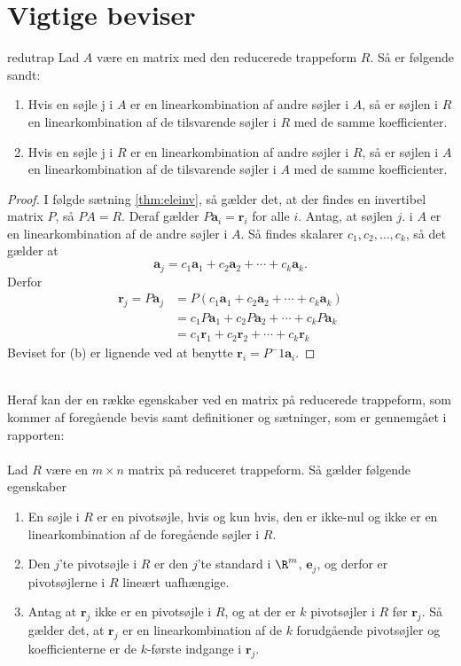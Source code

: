 \chapter{Vigtige beviser}

\begin{thm}{}{redutrap}
Lad $A$ være en matrix med den reducerede trappeform $R$. Så er følgende sandt:
\begin{enumerate}[label=(\alph*)]
\item  Hvis en søjle j i $A$ er en linearkombination  af andre søjler i $A$, så er søjlen i $R$ en linearkombination af de tilsvarende søjler i $R$ med de samme koefficienter.
\item  Hvis en søjle j i $R$ er en linearkombination  af andre søjler i $R$, så er søjlen i $A$ en linearkombination af de tilsvarende søjler i $A$ med de samme koefficienter.
\end{enumerate}
\end{thm}%
\begin{proof}
I følgde sætning \ref{thm:eleinv}, så gælder det, at der findes en invertibel matrix $P$, så $PA=R$. Deraf gælder $P\textbf{a}_i=\textbf{r}_i$ for alle $i$. Antag, at søjlen $j$. i $A$ er en linearkombination af de andre søjler i $A$. Så findes skalarer $c_1,c_2,\ldots,c_k$, så det gælder at \\
\begin{equation}
\textbf{a}_j=c_1\textbf{a}_1+c_2\textbf{a}_2+\cdots+c_k\textbf{a}_k.
\end{equation}
Derfor 
\begin{align*}
\textbf{r}_j=P\textbf{a}_j&=P(c_1\textbf{a}_1+c_2\textbf{a}_2+\cdots+c_k\textbf{a}_k) \\
&= c_1P\textbf{a}_1+c_2P\textbf{a}_2+\cdots+c_kP\textbf{a}_k\\
&= c_1\textbf{r}_1+c_2\textbf{r}_2+\cdots+c_k\textbf{r}_k
\end{align*}
Beviset for (b) er lignende ved at benytte $\textbf{r}_i=P^-1\textbf{a}_i.$
\end{proof} \\
%
Heraf kan der en række egenskaber ved en matrix på reducerede trappeform, som kommer af foregående bevis samt definitioner og sætninger, som er gennemgået i rapporten: \\\\
%
Lad $R$ være en $m \times n$ matrix på reduceret trappeform. Så gælder følgende egenskaber
\begin{enumerate}[label=(\alph*)]
\item En søjle i $R$ er en pivotsøjle, hvis og kun hvis, den er ikke-nul og ikke er en linearkombination af de foregående søjler i $R$. 
\item Den $j$'te pivotsøjle i $R$ er den $j$'te standard i $\R^m$, $\textbf{e}_j$, og derfor er pivotsøjlerne i $R$ lineært uafhængige. 
\item Antag at $\textbf{r}_j$ ikke er en pivotsøjle i $R$, og at der er $k$ pivotsøjler i $R$ før $\textbf{r}_j$. Så gælder det, at $\textbf{r}_j$ er en linearkombination af de $k$ forudgående pivotsøjler og koefficienterne er de $k$-første indgange i $\textbf{r}_j$. 
\end{enumerate}

